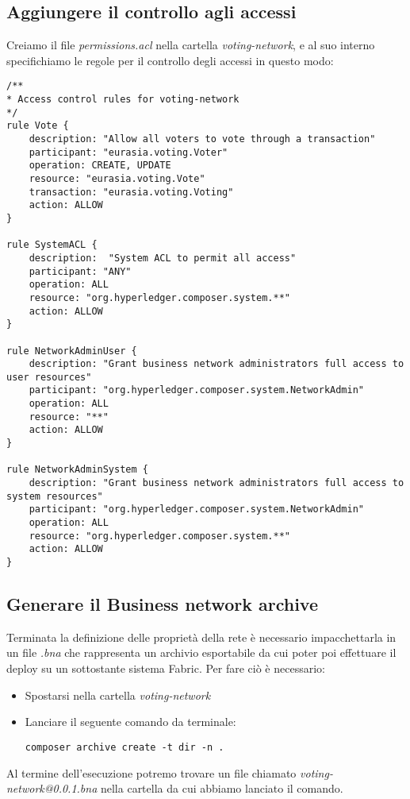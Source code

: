 	\subsection{Aggiungere il controllo agli accessi}
		Creiamo il file \emph{permissions.acl} nella cartella \emph{voting-network}, e al suo interno specifichiamo le regole per il controllo degli accessi in questo modo:
\begin{lstlisting}
/**
* Access control rules for voting-network
*/
rule Vote {
	description: "Allow all voters to vote through a transaction"
	participant: "eurasia.voting.Voter"
	operation: CREATE, UPDATE
	resource: "eurasia.voting.Vote"
	transaction: "eurasia.voting.Voting"
	action: ALLOW
}

rule SystemACL {
	description:  "System ACL to permit all access"
	participant: "ANY"
	operation: ALL
	resource: "org.hyperledger.composer.system.**"
	action: ALLOW
}

rule NetworkAdminUser {
	description: "Grant business network administrators full access to user resources"
	participant: "org.hyperledger.composer.system.NetworkAdmin"
	operation: ALL
	resource: "**"
	action: ALLOW
}

rule NetworkAdminSystem {
	description: "Grant business network administrators full access to system resources"
	participant: "org.hyperledger.composer.system.NetworkAdmin"
	operation: ALL
	resource: "org.hyperledger.composer.system.**"
	action: ALLOW
}
\end{lstlisting}

	\subsection{Generare il Business network archive}
		Terminata la definizione delle proprietà della rete è necessario impacchettarla in un file \emph{.bna} che rappresenta un archivio esportabile da cui poter poi effettuare il deploy su un sottostante sistema Fabric.
		Per fare ciò è necessario:
		\begin{itemize}
			\item Spostarsi nella cartella \emph{voting-network}
			\item Lanciare il seguente comando da terminale:
				\begin{lstlisting}
composer archive create -t dir -n .
				\end{lstlisting}
		\end{itemize}
		Al termine dell'esecuzione potremo trovare un file chiamato \emph{voting-network@0.0.1.bna} nella cartella da cui abbiamo lanciato il comando.